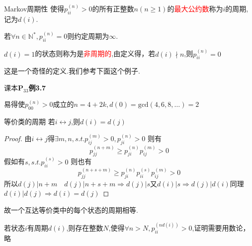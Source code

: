 \documentclass{elegantbook}
\begin{document}
\begin{definition}{Markov周期性}{}
    使得$p_{ii}^{(n)}>0$的所有正整数$n(n\geq 1)$的\textcolor{red}{最大公约数}称为$i$的周期,记为$d(i)$.
    \par 若$\forall n\in \mathbb{N}^* ,p_{ii}^{(n)}=0$则约定周期为$\infty$.
    \par $d(i)=1$的状态则称为是\textcolor{red}{非周期的},由定义得，若$d(i)\nmid n$,则$p_{ii}^{(n)}=0$
\end{definition}
\begin{note}
    这是一个奇怪的定义.我们参考下面这个例子.
\end{note}
\begin{example}课本$\mathbf{P}_{33}$\textbf{例3.7}
    \begin{center}
    \end{center}
    易得使$p_{00}^{(n)}>0$成立的$n=4+2k,d(0)=\mathrm{gcd}(4,6,8,\dots)=2$
\end{example}
\begin{proposition}{等价类的周期}{}
    若$i\leftrightarrow j$,则$d(i)=d(j)$
    \begin{proof}
        由$i\leftrightarrow j$得$\exists m,n,s.t.p_{ij}^{(m)}>0,p_{ji}^{(n)}>0$
        则有\[p_{jj}^{(n+m)}\geq p_{ji}^{(n)}p_{ij}^{(m)}>0\]
        假如有$s, s.t.p_{ii}^{(s)}>0$
        则也有\[p_{jj}^{(n+s+m)}\geq p_{ji}^{(n)}p_{ii}^{(s)}p_{ij}^{(m)}>0\]
        所以$d(j)|n+m\quad d(j)|n+s+m\Rightarrow d(j)|s$又$d(i)|s\Rightarrow d(j)|d(i)$同理$d(i)|d(j)\Rightarrow d(i)=d(j)$
    \end{proof}
    \color{red}故一个互达等价类中的每个状态的周期相等.
\end{proposition}
\begin{proposition}{}{}
    若状态$i$有周期$d(i)$,则存在整数$N$,使得$\forall n>N,p_{ii}^{(nd(i))}>0$,证明需要用数论，略
\end{proposition}
\end{document}
